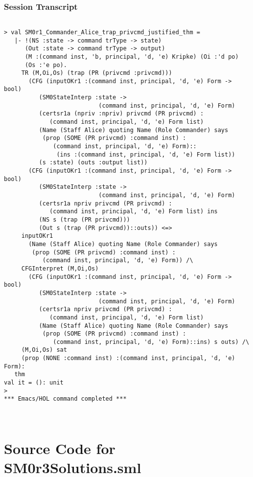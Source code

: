 \documentclass{report}
\begin{document}
\subsection{Session Transcript}
\label{trans3}
\begin{session}
  \begin{scriptsize}
\begin{verbatim}

> val SM0r1_Commander_Alice_trap_privcmd_justified_thm =
   |- !(NS :state -> command trType -> state)
      (Out :state -> command trType -> output)
      (M :(command inst, 'b, principal, 'd, 'e) Kripke) (Oi :'d po)
      (Os :'e po).
     TR (M,Oi,Os) (trap (PR (privcmd :privcmd)))
       (CFG (inputOKr1 :(command inst, principal, 'd, 'e) Form -> bool)
          (SM0StateInterp :state ->
                           (command inst, principal, 'd, 'e) Form)
          (certsr1a (npriv :npriv) privcmd (PR privcmd) :
             (command inst, principal, 'd, 'e) Form list)
          (Name (Staff Alice) quoting Name (Role Commander) says
           (prop (SOME (PR privcmd) :command inst) :
              (command inst, principal, 'd, 'e) Form)::
               (ins :(command inst, principal, 'd, 'e) Form list))
          (s :state) (outs :output list))
       (CFG (inputOKr1 :(command inst, principal, 'd, 'e) Form -> bool)
          (SM0StateInterp :state ->
                           (command inst, principal, 'd, 'e) Form)
          (certsr1a npriv privcmd (PR privcmd) :
             (command inst, principal, 'd, 'e) Form list) ins
          (NS s (trap (PR privcmd)))
          (Out s (trap (PR privcmd))::outs)) <=>
     inputOKr1
       (Name (Staff Alice) quoting Name (Role Commander) says
        (prop (SOME (PR privcmd) :command inst) :
           (command inst, principal, 'd, 'e) Form)) /\
     CFGInterpret (M,Oi,Os)
       (CFG (inputOKr1 :(command inst, principal, 'd, 'e) Form -> bool)
          (SM0StateInterp :state ->
                           (command inst, principal, 'd, 'e) Form)
          (certsr1a npriv privcmd (PR privcmd) :
             (command inst, principal, 'd, 'e) Form list)
          (Name (Staff Alice) quoting Name (Role Commander) says
           (prop (SOME (PR privcmd) :command inst) :
              (command inst, principal, 'd, 'e) Form)::ins) s outs) /\
     (M,Oi,Os) sat
     (prop (NONE :command inst) :(command inst, principal, 'd, 'e) Form):
   thm
val it = (): unit
> 
*** Emacs/HOL command completed ***



\end{verbatim}
  \end{scriptsize}
\end{session}



\appendix{}
\chapter{Source Code for SM0r3Solutions.sml}
\label{cha:source-code}

\end{document}

